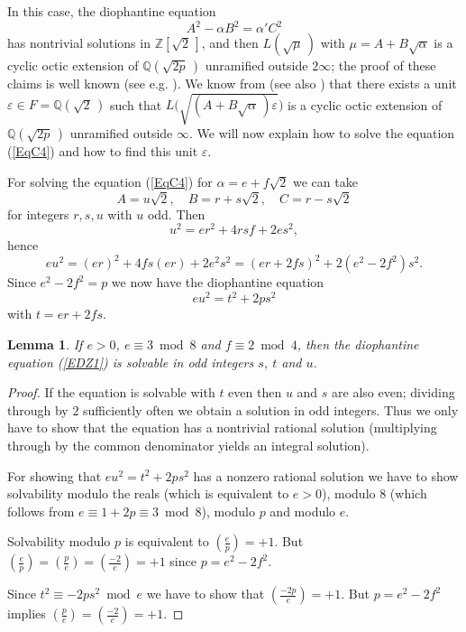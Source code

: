 \documentclass{amsart}
\newtheorem{lem}{Lemma}
\newcommand{\Z}{{\mathbb Z}}
\newcommand{\Q}{{\mathbb Q}}
\newcommand{\eps}{\varepsilon}
\begin{document}
In this case, the diophantine equation
\begin{equation}\label{EqC4} A^2 - \alpha B^2 = \alpha'C^2 \end{equation}
has nontrivial solutions in $\Z[\sqrt{2}\,]$, and then $L(\sqrt{\mu}\,)$
with $\mu = A+B\sqrt{\alpha}$ is a cyclic octic extension of
$\Q(\sqrt{2p}\,)$ unramified outside $2 \infty$; the proof of these
claims is well known (see e.g. \cite{LemD}). We know from \cite{LTh}
(see also \cite[Cor. 5.3]{LemDir}) that  
there exists a unit $\eps \in F = \Q(\sqrt{2}\,)$ such that
$L\big(\sqrt{(A+B\sqrt{\alpha}\,)\eps}\big)$ is a cyclic octic extension of
$\Q(\sqrt{2p}\,)$ unramified outside $\infty$. 
We will now explain how to solve the equation (\ref{EqC4}) and how to
find this unit $\eps$.

For solving the equation (\ref{EqC4}) for $\alpha = e + f\sqrt{2}$ we can take
$$ A = u\sqrt{2}, \quad B = r + s \sqrt{2}, \quad C = r - s\sqrt{2} $$
for integers $r, s, u$ with $u$ odd. Then
$$ u^2 = er^2 + 4rsf + 2es^2, $$
hence
$$ eu^2 = (er)^2 + 4fs(er) + 2e^2s^2 = (er+2fs)^2 + 2(e^2 - 2f^2)s^2. $$
Since $e^2 - 2f^2 = p$ we now have the diophantine equation
\begin{equation}\label{EDZ1} eu^2 = t^2 + 2ps^2 \end{equation}
with $t = er + 2fs$.

\begin{lem}
  If $e > 0$, $e \equiv 3 \bmod 8$ and $f \equiv 2 \bmod 4$, then the
  diophantine equation (\ref{EDZ1}) is solvable in odd integers
  $s$, $t$ and $u$.
\end{lem}

\begin{proof}
  If the equation is solvable with $t$ even then $u$ and $s$ are
  also even; dividing through by $2$ sufficiently often we obtain a solution
  in odd integers. Thus we only have to show that the equation has a
  nontrivial rational solution (multiplying through by the common
  denominator yields an integral solution).

  For showing that $eu^2 = t^2 + 2ps^2$ has a nonzero rational solution
  we have to show solvability modulo the reals (which is equivalent to
  $e > 0$), modulo $8$ (which follows from $e \equiv 1 + 2p \equiv 3 \bmod 8$),
  modulo $p$ and modulo $e$.

  Solvability modulo $p$ is equivalent to $(\frac ep) = +1$.
  But $(\frac ep) = (\frac pe) = (\frac{-2}e) = +1$ since $p  = e^2 - 2f^2$.

  Since $t^2 \equiv -2ps^2 \bmod e$ we have to show that
  $(\frac{-2p}{e}) = +1$.
  But $p = e^2 - 2f^2$ implies $(\frac{p}e) = (\frac{-2}e) = +1$.   
\end{proof}
\end{document}
